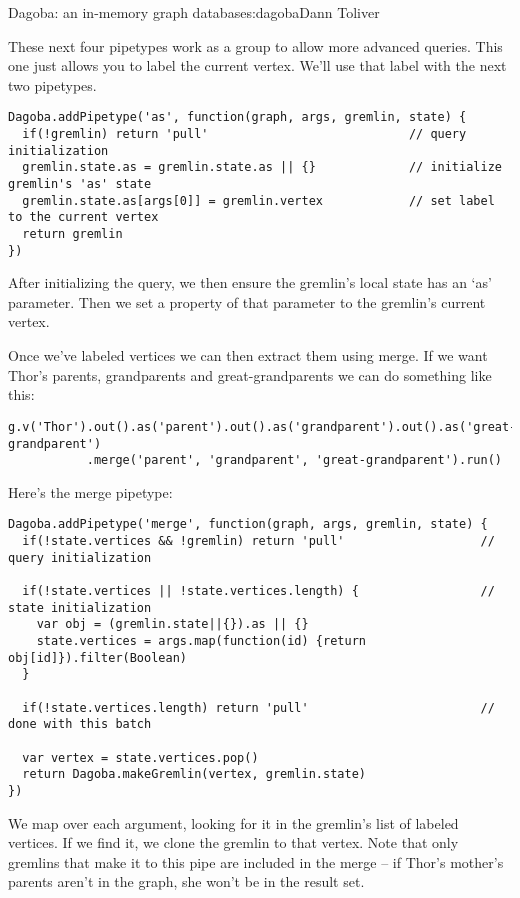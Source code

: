 \begin{aosachapter}{Dagoba: an in-memory graph database}{s:dagoba}{Dann Toliver}
\label{as}

These next four pipetypes work as a group to allow more advanced
queries. This one just allows you to label the current vertex. We'll use
that label with the next two pipetypes.

\begin{verbatim}
Dagoba.addPipetype('as', function(graph, args, gremlin, state) {
  if(!gremlin) return 'pull'                            // query initialization
  gremlin.state.as = gremlin.state.as || {}             // initialize gremlin's 'as' state
  gremlin.state.as[args[0]] = gremlin.vertex            // set label to the current vertex
  return gremlin
})
\end{verbatim}

After initializing the query, we then ensure the gremlin's local state
has an `as' parameter. Then we set a property of that parameter to the
gremlin's current vertex.

\label{merge}

Once we've labeled vertices we can then extract them using merge. If we
want Thor's parents, grandparents and great-grandparents we can do
something like this:

\begin{verbatim}
g.v('Thor').out().as('parent').out().as('grandparent').out().as('great-grandparent')
           .merge('parent', 'grandparent', 'great-grandparent').run()
\end{verbatim}

Here's the merge pipetype:

\begin{verbatim}
Dagoba.addPipetype('merge', function(graph, args, gremlin, state) {
  if(!state.vertices && !gremlin) return 'pull'                   // query initialization

  if(!state.vertices || !state.vertices.length) {                 // state initialization
    var obj = (gremlin.state||{}).as || {}
    state.vertices = args.map(function(id) {return obj[id]}).filter(Boolean)
  }

  if(!state.vertices.length) return 'pull'                        // done with this batch

  var vertex = state.vertices.pop()
  return Dagoba.makeGremlin(vertex, gremlin.state)
})
\end{verbatim}

We map over each argument, looking for it in the gremlin's list of
labeled vertices. If we find it, we clone the gremlin to that vertex.
Note that only gremlins that make it to this pipe are included in the
merge -- if Thor's mother's parents aren't in the graph, she won't be in
the result set.


\end{aosachapter}
